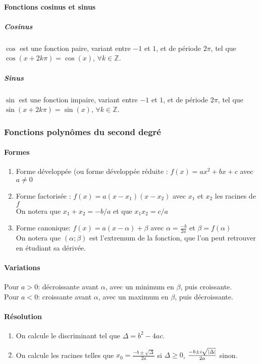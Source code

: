 \documentclass{article}
\begin{document}
\paragraph{Fonctions cosinus et sinus}
\subparagraph{Cosinus}
$\cos$ est une fonction paire, variant entre $-1$ et $1$, et de période $2\pi$, tel que $\cos(x + 2k\pi) = \cos(x)$, $\forall k \in \mathbb{Z}$.\\
\subparagraph{Sinus}
$\sin$ est une fonction impaire, variant entre $-1$ et $1$, et de période $2\pi$, tel que $\sin(x + 2k\pi) = \sin(x)$, $\forall k \in \mathbb{Z}$.


\subsubsection{Fonctions polynômes du second degré}

\paragraph{Formes}
\begin{enumerate}
	\item Forme développée (ou forme développée réduite : $f(x) = ax^2+bx+c$ avec $a \neq 0$
	\item Forme factorisée : $f(x) = a(x - x_1)(x - x_2)$ avec $x_1$ et $x_2$ les racines de $f$\\
	      On notera que $x_1+x_2=-b/a$ et que $x_1x_2=c/a$
	\item Forme canonique: $f(x) = a(x-\alpha)+\beta$ avec $\alpha = \frac{-b}{2a}$ et $\beta = f(\alpha)$\\
	      On notera que $(\alpha;\beta)$ est l'extremum de la fonction, que l'on peut retrouver en étudiant sa dérivée.
\end{enumerate}

\paragraph{Variations}
Pour $a > 0$: décroissante avant $\alpha$, avec un minimum en $\beta$, puis croissante.\\
Pour $a < 0$: croissante avant $\alpha$, avec un maximum en $\beta$, puis décroissante.

\paragraph{Résolution}
\begin{enumerate}
	\item On calcule le discriminant tel que $\Delta = b^2 - 4ac$.
	\item On calcule les racines telles que $x_0 = \frac{-b \pm \sqrt{\Delta}}{2a}$ si $\Delta \ge 0$, $\frac{-b \pm i\sqrt{\abs{\Delta}}}{2a}$ sinon.
\end{enumerate}
\end{document}
